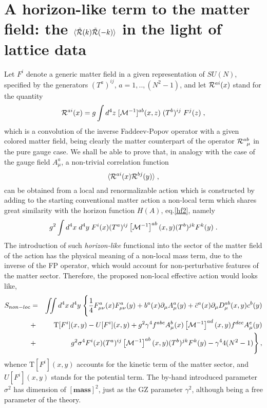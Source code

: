 \section{A horizon-like term to the matter field: the $\langle {\tilde {\cal R}}(k) {\tilde
{\cal R}}(-k) \rangle$ in the light of lattice data}


Let $F^{i}$ denote a generic matter field in a  given
representation of $SU(N)$, specified by the generators $(T^a)^{ij}$, $a=1,..,(N^2-1)$, and let
${\cal R}^{ai}(x)$ stand for the quantity
\begin{equation}
{\cal R}^{ai}(x)  =  g \int d^4z\;  [{\cal M}^{-1}]^{ab} (x,z)   \;(T^b)^{ij} \;F^{j}(z)   \label{rmatter}  \;, 
\end{equation}
which is a convolution of the inverse Faddeev-Popov operator with a given colored matter field,
being clearly the matter counterpart of the operator ${\cal R}^{ab}_{\;\;\mu}$ in the pure
gauge case. We shall be able to prove that, in analogy with the case of the gauge field
$A^a_\mu$, a non-trivial correlation function 
\begin{equation} 
 \langle {\cal R}^{ai}(x)  {\cal R}^{bj}(y)  \rangle    \;, \label{rcm} 
\end{equation} 
can be obtained from a local and renormalizable action  which is constructed by adding to the
starting conventional matter action a non-local term which shares great similarity with the
horizon function $H(A)$, eq.\eqref{hf2}, namely 
\begin{equation}
{g^{2}}   \int d^{4}x\;d^{4}y\; F^{i}(x) (T^a)^{ij} \left[ {\cal M}^{-1}\right]^{ab} (x,y)
(T^b)^{jk} F^{k} (y) \;.    
\label{hmatter}
\end{equation} 
The introduction of such \emph{horizon-like} functional into the sector of the matter field of
the action has the physical meaning of a non-local mass term, due to the inverse of the FP
operator, which would account for non-perturbative features of the matter sector. Therefore,
the proposed non-local effective action would looks like,
\begin{eqnarray}
S_{non-loc} &=& \iint d^4x\,d^{4}y\; \Biggl\{
\frac{1}{4}F^a_{\mu\nu}(x) F^a_{\mu\nu}(y)
+ b^{a}(x)\partial_{\mu}A^{a}_{\mu}(y)
+ \bar{c}^{a}(x)\partial_{\mu}D^{ab}_{\mu}(x,y)c^{b}(y)
\nonumber \\
&+&
\text{T}[F^{i}](x,y)
- U[F^{i}](x,y)
+ {g^{2}}\gamma^{4} f^{abc}A_{\mu}^{b}(x)\left[ {\cal M}^{-1}\right]^{ad}
(x,y)f^{dec}A_{\mu}^{e}(y) 
\nonumber \\
&+&
{g^{2}}\sigma^{4}  F^{i}(x) (T^a)^{ij} \left[ {\cal M}^{-1}\right]^{ab} (x,y)
(T^b)^{jk} F^{k} (y)
-\gamma^{4}4(N^{2}-1)
\Biggr\}\,,
\label{mnlocalact}
\end{eqnarray}
whence $\text{T}[F^{i}](x,y)$ accounts for the kinetic term of the matter sector, and
$U[F^{i}](x,y)$ stands for the potential term. The by-hand introduced parameter $\sigma^{2}$
has dimension of $\pmb{[mass]}^{2}$, just as the GZ parameter $\gamma^{2}$, although being a
free parameter of the theory.

